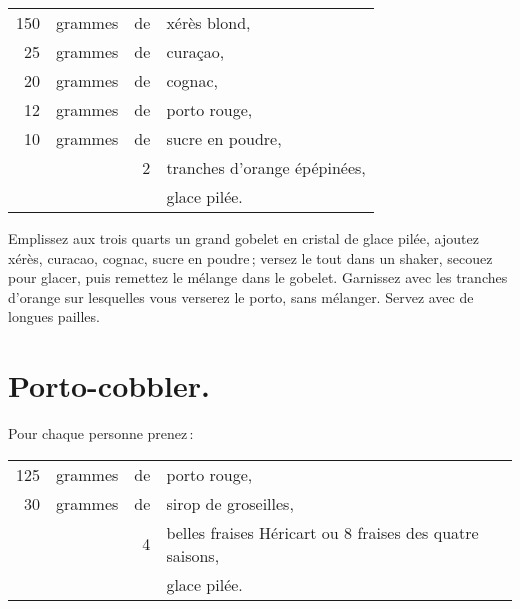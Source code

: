 \footnotesize
\begin{longtable}{rrrp{16em}}
    150 & grammes & de & xérès blond,                                                                     \\
     25 & grammes & de & curaçao,                                                                         \\
     20 & grammes & de & cognac,                                                                          \\
     12 & grammes & de & porto rouge,                                                                     \\
     10 & grammes & de & sucre en poudre,                                                                 \\
        &         &  2 & tranches d'orange épépinées,                                                     \\
        &         &    & glace pilée.                                                                     \\
\end{longtable}
\normalsize

Emplissez aux trois quarts un grand gobelet en cristal de glace pilée, ajoutez
xérès, curacao, cognac, sucre en poudre ; versez le tout dans un shaker,
secouez pour glacer, puis remettez le mélange dans le gobelet. Garnissez avec
les tranches d'orange sur lesquelles vous verserez le porto, sans mélanger.
Servez avec de longues pailles.

\section*{\centering Porto-cobbler.}
{}

Pour chaque personne prenez :

\footnotesize
\begin{longtable}{rrrp{16em}}
    125 & grammes & de & porto rouge,                                                                     \\
     30 & grammes & de & sirop de groseilles,                                                             \\
        &         &  4 & belles fraises Héricart ou 8 fraises des quatre saisons,                         \\
        &         &    & glace pilée.                                                                     \\
\end{longtable}
\normalsize

